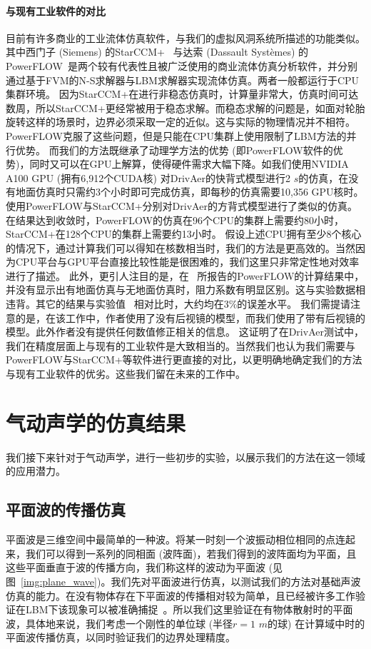 \paragraph{与现有工业软件的对比}
目前有许多商业的工业流体仿真软件，与我们的虚拟风洞系统所描述的功能类似。其中西门子 (Siemens) 的StarCCM+~\citep{Siemens} 与达索 (Dassault Syst{\`e}mes) 的PowerFLOW~\citep{powerflow}是两个较有代表性且被广泛使用的商业流体仿真分析软件，并分别通过基于FVM的N-S求解器与LBM求解器实现流体仿真。两者一般都运行于CPU集群环境。
因为StarCCM+在进行非稳态仿真时，计算量非常大，仿真时间可达数周，所以StarCCM+更经常被用于稳态求解。而稳态求解的问题是，如面对轮胎旋转这样的场景时，边界必须采取一定的近似。这与实际的物理情况并不相符。PowerFLOW克服了这些问题，但是只能在CPU集群上使用限制了LBM方法的并行优势。
而我们的方法既继承了动理学方法的优势 (即PowerFLOW软件的优势)，同时又可以在GPU上解算，使得硬件需求大幅下降。如我们使用NVIDIA A100 GPU (拥有6,912个CUDA核) 对DrivAer的快背式模型进行2 $s$的仿真，在没有地面仿真时只需约3个小时即可完成仿真，即每秒的仿真需要10,356 GPU核时。
\citet{James-2018} 使用PowerFLOW与StarCCM+分别对DrivAer的方背式模型进行了类似的仿真。在结果达到收敛时，PowerFLOW的仿真在96个CPU的集群上需要约80小时，StarCCM+在128个CPU的集群上需要约13小时。
假设上述CPU拥有至少8个核心的情况下，通过计算我们可以得知在核数相当时，我们的方法是更高效的。当然因为CPU平台与GPU平台直接比较性能是很困难的，我们这里只非常定性地对效率进行了描述。
此外，更引人注目的是，在~\citet{James-2018} 所报告的PowerFLOW的计算结果中，并没有显示出有地面仿真与无地面仿真时，阻力系数有明显区别。这与实验数据相违背。其它的结果与实验值~\citep{Heft-2012b} 相对比时，大约均在3\%的误差水平。
我们需提请注意的是，在该工作中，作者使用了没有后视镜的模型，而我们使用了带有后视镜的模型。此外作者没有提供任何数值修正相关的信息。
这证明了在DrivAer测试中，我们在精度层面上与现有的工业软件是大致相当的。当然我们也认为我们需要与PowerFLOW与StarCCM+等软件进行更直接的对比，以更明确地确定我们的方法与现有工业软件的优劣。这些我们留在未来的工作中。

\section{气动声学的仿真结果}
我们接下来针对于气动声学，进行一些初步的实验，以展示我们的方法在这一领域的应用潜力。
\subsection{平面波的传播仿真}
平面波是三维空间中最简单的一种波。将某一时刻一个波振动相位相同的点连起来，我们可以得到一系列的同相面 (波阵面)，若我们得到的波阵面均为平面，且这些平面垂直于波的传播方向，我们称这样的波动为平面波 (见图~\ref{img:plane_wave})。我们先对平面波进行仿真，以测试我们的方法对基础声波仿真的能力。在没有物体存在下平面波的传播相对较为简单，且已经被许多工作验证在LBM下该现象可以被准确捕捉~\cite{doi:10.2514/6.2009-3395, viggen2009lattice}。所以我们这里验证在有物体散射时的平面波，具体地来说，我们考虑一个刚性的单位球 (半径$r=1$ $m$的球) 在计算域中时的平面波传播仿真，以同时验证我们的边界处理精度。

